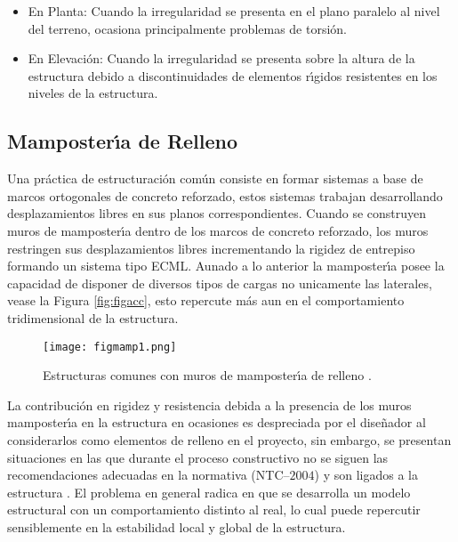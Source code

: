\begin{itemize}
	\item En Planta: Cuando la irregularidad se presenta en el plano paralelo al nivel del terreno, ocasiona principalmente problemas de torsi\'on.
	
	\newpage
	
	\item En Elevaci\'on: Cuando la irregularidad se presenta sobre la altura de la estructura debido a discontinuidades de elementos r\'{\i}gidos resistentes en los niveles de la estructura.
\end{itemize}

\subsection{Mamposter\'{\i}a de Relleno}
	
Una pr\'actica de estructuraci\'on com\'un consiste en formar sistemas a base de marcos ortogonales de concreto reforzado, estos sistemas trabajan desarrollando desplazamientos libres en sus planos correspondientes. Cuando se construyen muros de mamposter\'{\i}a dentro de los marcos de concreto reforzado, los muros restringen sus desplazamientos libres incrementando la rigidez de entrepiso formando un sistema tipo ECML. Aunado a lo anterior la mamposter\'{\i}a posee la capacidad de disponer de diversos tipos de cargas no unicamente las laterales, vease la Figura \ref{fig:figacc}, esto repercute m\'as aun en el comportamiento tridimensional de la estructura.

\begin{figure}[htbp]
	\centering
		\texttt{[image: figmamp1.png]}
	\caption{Estructuras comunes con muros de mamposter\'{\i}a de relleno \cite{WHE2011}.}
	\label{fig:figm1}
\end{figure}

La contribuci\'on en rigidez y resistencia debida a la presencia de los muros mamposter\'{\i}a en la estructura en ocasiones es despreciada por el dise\~nador al considerarlos como elementos de relleno en el proyecto, sin embargo, se presentan situaciones en las que durante el proceso constructivo no se siguen las recomendaciones adecuadas en la normativa (NTC--$2004$) y son ligados a la estructura \cite{WHE2011,KFM2007}. El problema en general radica en que se desarrolla un modelo estructural con un comportamiento distinto al real, lo cual puede repercutir sensiblemente en la estabilidad local y global de la estructura. 

\newpage


